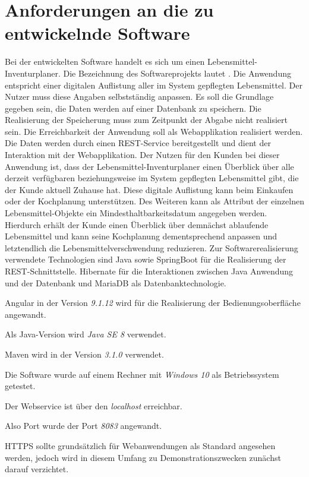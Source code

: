 \section{Anforderungen an die zu entwickelnde Software}
Bei der entwickelten Software handelt es sich um einen Lebensmittel-Inventurplaner.
Die Bezeichnung des Softwareprojekts lautet .
Die Anwendung entspricht einer digitalen Auflistung aller im System gepflegten Lebensmittel. 
Der Nutzer muss diese Angaben selbstständig anpassen. 
Es soll die Grundlage gegeben sein, die Daten werden auf einer Datenbank zu speichern.
Die Realisierung der Speicherung muss zum Zeitpunkt der Abgabe nicht realisiert sein. 
Die Erreichbarkeit der Anwendung soll als Webapplikation realisiert werden.
Die Daten werden durch einen \ac{REST}-Service bereitgestellt und dient der Interaktion mit der Webapplikation.
Der Nutzen für den Kunden bei dieser Anwendung ist, dass der Lebensmittel-Inventurplaner einen Überblick über alle derzeit verfügbaren beziehungsweise im System gepflegten Lebensmittel gibt, die der Kunde aktuell Zuhause hat. 
Diese digitale Auflistung kann beim Einkaufen oder der Kochplanung unterstützen. 
Des Weiteren kann als Attribut der einzelnen Lebensmittel-Objekte ein Mindesthaltbarkeitsdatum angegeben werden. 
Hierdurch erhält der Kunde einen Überblick über demnächst ablaufende Lebensmittel und kann seine Kochplanung dementsprechend anpassen und letztendlich die Lebensmittelverschwendung reduzieren.
Zur Softwarerealisierung verwendete Technologien sind Java sowie SpringBoot für die Realisierung der \ac{REST}-Schnittstelle. Hibernate für die Interaktionen zwischen Java Anwendung und der Datenbank und MariaDB als Datenbanktechnologie. 

Angular in der Version \textit{9.1.12} wird für die Realisierung der Bedienungsoberfläche angewandt.

Als Java-Version wird \textit{Java SE 8} verwendet.

Maven wird in der Version \textit{3.1.0} verwendet.

Die Software wurde auf einem Rechner mit \textit{Windows 10} als Betriebssystem getestet.

Der Webservice ist über den \textit{localhost} erreichbar.

Also Port wurde der Port \textit{8083} angewandt.

\ac{HTTPS} sollte grundsätzlich für Webanwendungen als Standard angesehen werden, 
jedoch wird in diesem Umfang zu Demonstrationszwecken zunächst darauf verzichtet.

